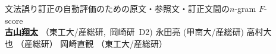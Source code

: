 \documentclass[11pt]{beamer}
\begin{document}
			\begin{frame}[t]
				\vspace*{-1em}
				\begin{columns}[t]
					\begin{column}{0.14\linewidth}
						\begin{center}
						\end{center}
					\end{column}
					\begin{column}{0.71\linewidth}
						\begin{center}
							\begingroup \large 文法誤り訂正の自動評価のための原文・参照文・訂正文間の$n$-gram $F$-score \endgroup \vspace{0.5em} \\
							\textbf{\underline{古山翔太}} \begingroup \small（東工大/産総研,\ 岡崎研\ D2) \endgroup \hspace{0.5em}
							永田亮 \begingroup \small (甲南大/産総研) \endgroup \hspace{0.5em}
							高村大也 \begingroup \small（産総研）\endgroup	\hspace{0.5em}
							岡崎直観 \begingroup \small（東工大/産総研）\endgroup
						\end{center}
					\end{column}
					\begin{column}{0.14\linewidth}
					\end{column}
				\end{columns}
				\vspace*{1em}


\end{frame}
\end{document}
